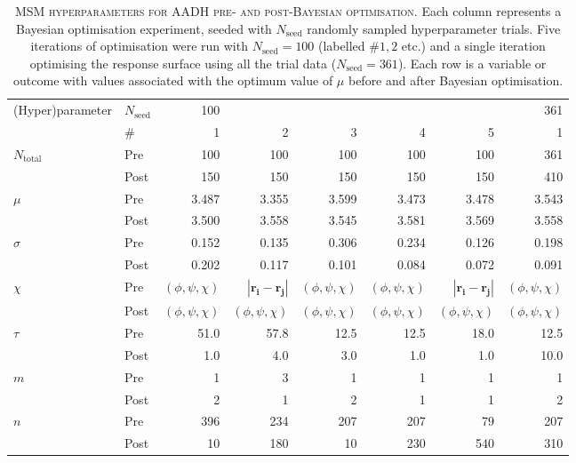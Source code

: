 \begin{table}
    \centering
    \caption[MSM hyperparameters for AADH pre- and post-Bayesian optimisation]{\textsc{MSM hyperparameters for AADH pre- and post-Bayesian optimisation}. Each column represents a Bayesian optimisation experiment, seeded with $N_{\mathrm{seed}}$ randomly sampled hyperparameter trials. Five iterations of optimisation were run with $N_{\mathrm{seed}}=100$ (labelled $\# 1, 2$ etc.) and a single iteration optimising the response surface using all the trial data ($N_{\mathrm{seed}}=361$). Each row is a variable or outcome with values associated with the optimum value of $\mu$ before and after Bayesian optimisation.}
    \begin{tabular}{llrrrrrr}
    \toprule
    (Hyper)parameter &$N_{\mathrm{seed}}$ & 100 & & & & &361\\
    &\#&1&2&3&4&5&1\\
    \midrule
    $N_{\mathrm{total}}$&Pre&100&100&100&100&100&361\\
    &Post&150&150&150&150&150&410\\
    \midrule
    $\mu$&Pre&3.487&3.355&3.599&3.473&3.478&3.543\\
    &Post&3.500&3.558&3.545&3.581&3.569&3.558\\
    \midrule
    $\sigma$&Pre&0.152&0.135&0.306&0.234&0.126&0.198\\
    &Post&0.202&0.117&0.101&0.084&0.072&0.091\\
    \midrule
    $\chi$&Pre&$(\phi,\psi,\chi)$&$|\mathbf{r_{i}}-\mathbf{r_{j}}|$&$(\phi,\psi,\chi)$&$(\phi,\psi,\chi)$&$|\mathbf{r_{i}}-\mathbf{r_{j}}|$&$(\phi,\psi,\chi)$\\
    &Post&$(\phi,\psi,\chi)$&$(\phi,\psi,\chi)$&$(\phi,\psi,\chi)$&$(\phi,\psi,\chi)$&$(\phi,\psi,\chi)$&$(\phi,\psi,\chi)$\\
    \midrule
    $\tau$&Pre&51.0&57.8&12.5&12.5&18.0&12.5\\
    &Post&1.0&4.0&3.0&1.0&1.0&10.0\\
    \midrule
    $m$&Pre&1&3&1&1&1&1\\
    &Post&2&1&2&1&1&2\\
    \midrule
    $n$&Pre&396&234&207&207&79&207\\
    &Post&10&180&10&230&540&310\\
    \bottomrule
    \end{tabular}
    \label{tab:aadh_opt_results}
\end{table}


